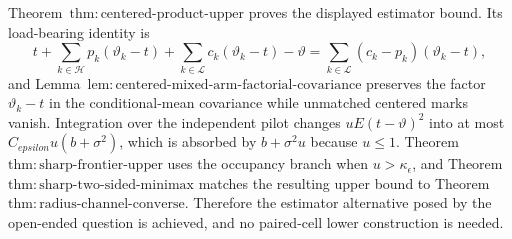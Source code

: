 Theorem~\(\mathrm{thm:centered\text{-}product\text{-}upper}\) proves the displayed estimator bound.  Its load-bearing identity is
\[
 t+\sum_{k\in\mathcal H}p_k(\vartheta_k-t)
 +\sum_{k\in\mathcal L}c_k(\vartheta_k-t)-\vartheta
 =\sum_{k\in\mathcal L}(c_k-p_k)(\vartheta_k-t),
\]
and Lemma~\(\mathrm{lem:centered\text{-}mixed\text{-}arm\text{-}factorial\text{-}covariance}\) preserves the factor \(\vartheta_k-t\) in the conditional-mean covariance while unmatched centered marks vanish.  Integration over the independent pilot changes \(uE(t-\vartheta)^2\) into at most \(C_{epsilon}u(b+\sigma^2)\), which is absorbed by \(b+\sigma^2u\) because \(u\le1\).  Theorem~\(\mathrm{thm:sharp\text{-}frontier\text{-}upper}\) uses the occupancy branch when \(u>\kappa_{\epsilon}\), and Theorem~\(\mathrm{thm:sharp\text{-}two\text{-}sided\text{-}minimax}\) matches the resulting upper bound to Theorem~\(\mathrm{thm:radius\text{-}channel\text{-}converse}\).  Therefore the estimator alternative posed by the open-ended question is achieved, and no paired-cell lower construction is needed.